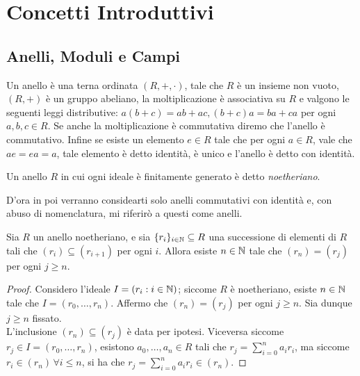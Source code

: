 \chapter{Concetti Introduttivi}

    \section{Anelli, Moduli e Campi}
        Un anello è una terna ordinata $(R,+,\cdot)$, tale che $R$ è un insieme non vuoto, $(R,+)$ è un gruppo abeliano, la moltiplicazione 
        è associativa su $R$ e valgono le seguenti leggi distributive: $a(b + c) = ab + ac, (b + c)a = ba + ca$ per ogni $a,b,c \in R$. Se 
        anche la moltiplicazione è commutativa diremo che l'anello è commutativo. Infine se esiste un elemento $e \in R$ tale che per ogni 
        $a \in R$, vale che $ae = ea = a$, tale elemento è detto identità, è unico e l'anello è detto con identità. \\
        \begin{comment}
            Un sottoinsieme $I \subseteq R$ si dice ideale se: è non vuoto, è un sottogruppo per la somma e per ogni $a \in I, r \in R, ar \in I$  
        e si indica con $I \ideal R$. Sia $a \in R$, si indica con $(a)$ l'ideale principale generato da $a$, ed è definito come $(a) = \{ar : 
        r \in R\}$. Si dice che gli elementi $r_1,\ldots,r_n \in R$ generano l'ideale $I$ e si scrive $I = (r_1,\ldots,r_n)$ se per ogni $a \in 
        I$ esistono $a_1,\ldots,a_n \in R$ tali che $a = \sum_{i=1}^n a_ir_i$.
        \end{comment}
        \begin{definizione}
            Un anello $R$ in cui ogni ideale è finitamente generato è detto \emph{noetheriano}.
        \end{definizione}
        D'ora in poi verranno considearti solo anelli commutativi con identità e, con abuso di nomenclatura, mi riferirò a questi come anelli.
        \begin{esercizio}\label{ex:noet-ring}
            Sia $R$ un anello noetheriano, e sia $\{r_i\}_{i \in \mathbb{N}} \subseteq R$ una successione di elementi di $R$ tali che $(r_i) \subseteq 
            (r_{i+1})$ per ogni $i$. Allora esiste $n \in \mathbb{N}$ tale che $(r_n) = (r_j)$ per ogni $j \geq n$.
        \end{esercizio}
        \begin{proof}
            Considero l'ideale $I = (r_i : i \in \mathbb{N})$; siccome $R$ è noetheriano, esiste $n \in \mathbb{N}$ tale che $I = (r_0,\ldots,r_n)$. Affermo che $(r_n) = 
            (r_j)$ per ogni $j \geq n$. Sia dunque $j \geq n$ fissato. \\
            L'inclusione $(r_n) \subseteq (r_j)$ è data per ipotesi. Viceversa siccome $r_j \in I = (r_0,\ldots,r_n)$, esistono $a_0,\ldots,a_n \in R$ tali 
            che $r_j = \sum_{i=0}^n a_ir_i$, ma siccome $r_i \in (r_n) \, \forall i \leq n$, si ha che $r_j = \sum_{i=0}^n a_ir_i \in (r_n)$.
        \end{proof}
